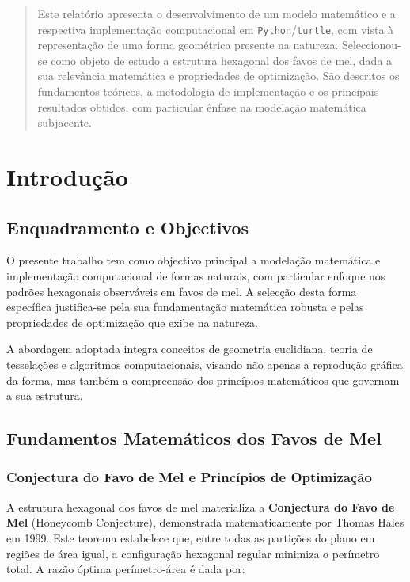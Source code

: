 \documentclass[12pt,a4paper,oneside]{extarticle}
\begin{document}

\begin{abstract}
Este relatório apresenta o desenvolvimento de um modelo matemático e a respectiva implementação computacional em \texttt{Python}/\texttt{turtle}, com vista à representação de uma forma geométrica presente na natureza. Seleccionou-se como objeto de estudo a estrutura hexagonal dos favos de mel, dada a sua relevância matemática e propriedades de optimização. São descritos os fundamentos teóricos, a metodologia de implementação e os principais resultados obtidos, com particular ênfase na modelação matemática subjacente.
\end{abstract}

\clearpage

\section{Introdução}

\subsection{Enquadramento e Objectivos}
O presente trabalho tem como objectivo principal a modelação matemática e implementação computacional de formas naturais, com particular enfoque nos padrões hexagonais observáveis em favos de mel. A selecção desta forma específica justifica-se pela sua fundamentação matemática robusta e pelas propriedades de optimização que exibe na natureza.

A abordagem adoptada integra conceitos de geometria euclidiana, teoria de tesselações e algoritmos computacionais, visando não apenas a reprodução gráfica da forma, mas também a compreensão dos princípios matemáticos que governam a sua estrutura.

\subsection{Fundamentos Matemáticos dos Favos de Mel}

\subsubsection{Conjectura do Favo de Mel e Princípios de Optimização}
A estrutura hexagonal dos favos de mel materializa a \textbf{Conjectura do Favo de Mel} (Honeycomb Conjecture), demonstrada matematicamente por Thomas Hales em 1999. Este teorema estabelece que, entre todas as partições do plano em regiões de área igual, a configuração hexagonal regular minimiza o perímetro total. A razão óptima perímetro-área é dada por:
\end{document}
